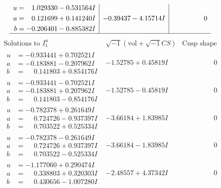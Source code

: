 \documentclass[1p]{elsarticle_modified}
\theoremstyle{definition}
\newcommand{\I}{\sqrt{-1}}
\begin{document}
$$\begin{array}{c|c|c}
\begin{aligned}
u &= \phantom{-}1.029330 - 0.531564 I \\
a &= \phantom{-}0.121699 + 0.141240 I \\
b &= -0.206401 - 0.885382 I\end{aligned}
 & -0.39437 - 4.15714 I & \phantom{-0.000000 } 0\\
 \hline 
 \end{array}$$\newpage$$\begin{array}{c|c|c}  
\text{Solutions to }I^u_{1}& \I (\text{vol} + \sqrt{-1}CS) & \text{Cusp shape}\\
 \hline 
\begin{aligned}
u &= -0.933441 + 0.702521 I \\
a &= -0.183881 - 0.207962 I \\
b &= \phantom{-}0.141803 + 0.854176 I\end{aligned}
 & -1.52785 + 0.45819 I & \phantom{-0.000000 } 0 \\ \hline\begin{aligned}
u &= -0.933441 - 0.702521 I \\
a &= -0.183881 + 0.207962 I \\
b &= \phantom{-}0.141803 - 0.854176 I\end{aligned}
 & -1.52785 - 0.45819 I & \phantom{-0.000000 } 0 \\ \hline\begin{aligned}
u &= -0.782378 + 0.261649 I \\
a &= \phantom{-}0.724726 - 0.937397 I \\
b &= \phantom{-}0.703522 + 0.525334 I\end{aligned}
 & -3.66184 + 1.83985 I & \phantom{-0.000000 } 0 \\ \hline\begin{aligned}
u &= -0.782378 - 0.261649 I \\
a &= \phantom{-}0.724726 + 0.937397 I \\
b &= \phantom{-}0.703522 - 0.525334 I\end{aligned}
 & -3.66184 - 1.83985 I & \phantom{-0.000000 } 0 \\ \hline\begin{aligned}
u &= -1.177060 + 0.290474 I \\
a &= \phantom{-}0.338803 + 0.320303 I \\
b &= \phantom{-}0.430656 - 1.007280 I\end{aligned}
 & -2.48557 + 4.37342 I & \phantom{-0.000000 } 0 \\ \hline\begin{aligned}

\end{aligned}
\end{array}$$
\end{document}
